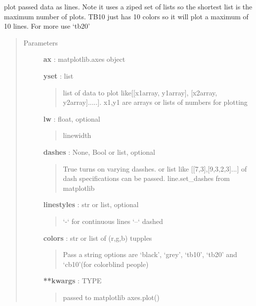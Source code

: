 \documentclass[letterpaper,10pt,english]{sphinxmanual}
\begin{document}
\begin{fulllineitems}
\label{pubplots:pubplots.plot.plot_lines}
plot passed data as lines. Note it uses a ziped set  of lists so the shortest
list is the maximum number of plots. TB10 just has 10 colors so it will plot a maximum of 10
lines. For more use `tb20'
\begin{quote}\begin{description}
\item[{Parameters}] \leavevmode
\textbf{ax} : matplotlib.axes object

\textbf{yset} : list
\begin{quote}

list of data to plot like{[}{[}x1array, y1array{]}, {[}x2array, y2array{]}.....{]}.
x1,y1 are arrays or lists of numbers for plotting
\end{quote}

\textbf{lw} : float, optional
\begin{quote}

linewidth
\end{quote}

\textbf{dashes} : None, Bool or list, optional
\begin{quote}

True turns on varying dasshes. or list like {[}{[}7,3{]},{[}9,3,2,3{]}...{]} of dash specifications
can be passed. line.set\_dashes from matplotlib
\end{quote}

\textbf{linestyles} : str or list, optional
\begin{quote}

`-` for continuous lines `--` dashed
\end{quote}

\textbf{colors} : str or list of (r,g,b) tupples
\begin{quote}

Pass a string options are `black', `grey', `tb10', `tb20' and `cb10'(for colorblind people)
\end{quote}

\textbf{**kwargs} : TYPE
\begin{quote}

passed to matplotlib axes.plot()
\end{quote}

\end{description}\end{quote}

\end{fulllineitems}
\end{document}
